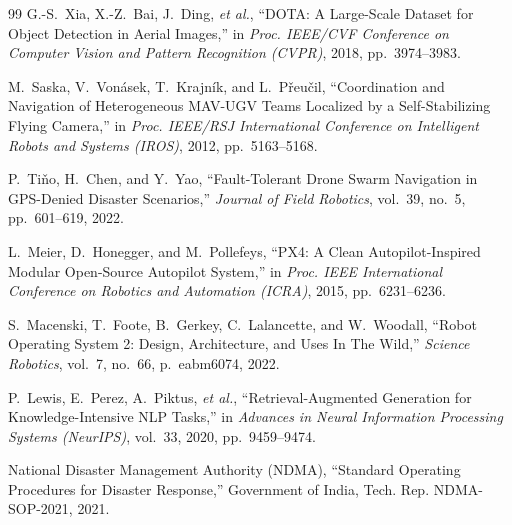 \documentclass[journal]{IEEEtran}
\begin{document}
\begin{thebibliography}{99}
 G.-S.~Xia, X.-Z.~Bai, J.~Ding, \textit{et al.}, ``DOTA: A Large-Scale Dataset for Object Detection in Aerial Images,'' in \textit{Proc. IEEE/CVF Conference on Computer Vision and Pattern Recognition (CVPR)}, 2018, pp.~3974--3983.

 M.~Saska, V.~Von\'{a}sek, T.~Krajn\'{i}k, and L.~P\v{r}eu\v{c}il, ``Coordination and Navigation of Heterogeneous MAV-UGV Teams Localized by a Self-Stabilizing Flying Camera,'' in \textit{Proc. IEEE/RSJ International Conference on Intelligent Robots and Systems (IROS)}, 2012, pp.~5163--5168.

 P.~Ti\v{n}o, H.~Chen, and Y.~Yao, ``Fault-Tolerant Drone Swarm Navigation in GPS-Denied Disaster Scenarios,'' \textit{Journal of Field Robotics}, vol.~39, no.~5, pp.~601--619, 2022.

 L.~Meier, D.~Honegger, and M.~Pollefeys, ``PX4: A Clean Autopilot-Inspired Modular Open-Source Autopilot System,'' in \textit{Proc. IEEE International Conference on Robotics and Automation (ICRA)}, 2015, pp.~6231--6236.

 S.~Macenski, T.~Foote, B.~Gerkey, C.~Lalancette, and W.~Woodall, ``Robot Operating System 2: Design, Architecture, and Uses In The Wild,'' \textit{Science Robotics}, vol.~7, no.~66, p.~eabm6074, 2022.

 P.~Lewis, E.~Perez, A.~Piktus, \textit{et al.}, ``Retrieval-Augmented Generation for Knowledge-Intensive NLP Tasks,'' in \textit{Advances in Neural Information Processing Systems (NeurIPS)}, vol.~33, 2020, pp.~9459--9474.

 National Disaster Management Authority (NDMA), ``Standard Operating Procedures for Disaster Response,'' Government of India, Tech. Rep. NDMA-SOP-2021, 2021.

\end{thebibliography}
\end{document}
